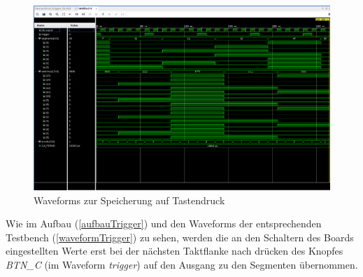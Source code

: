 \documentclass[11pt, a4paper]{article}
\begin{document}
\begin{figure}[H]    
    \centering
    \includegraphics[width=\linewidth]{versuch4Data/hierarchical_trigger.png}
    \caption{Waveforms zur Speicherung auf Tastendruck}
    \label{waveformTrigger}        
\end{figure}
Wie im Aufbau (\autoref{aufbauTrigger}) und den Waveforms der entsprechenden Testbench (\autoref{waveformTrigger}) zu sehen, werden die an den Schaltern des Boards eingestellten Werte erst bei der nächsten Taktflanke nach drücken des Knopfes \textit{BTN\_C} (im Waveform \textit{trigger}) auf den Ausgang zu den Segmenten übernommen.

\newpage
\end{document}
